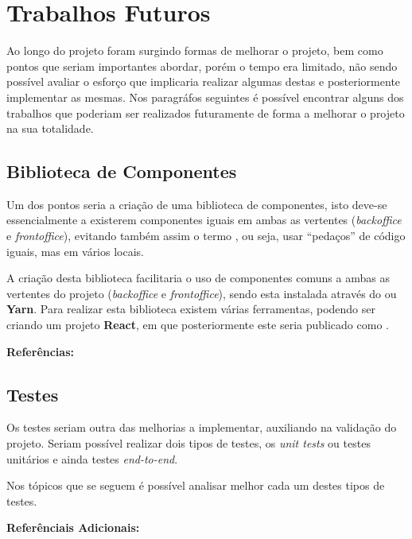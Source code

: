 \section{Trabalhos Futuros}

Ao longo do projeto foram surgindo formas de melhorar o projeto, bem como pontos que seriam importantes abordar, porém o tempo era limitado, não sendo possível avaliar o esforço que implicaria realizar algumas destas e posteriormente implementar as mesmas. Nos paragráfos seguintes é possível encontrar alguns dos trabalhos que poderiam ser realizados futuramente de forma a melhorar o projeto na sua totalidade.

\subsection{Biblioteca de Componentes}

Um dos pontos seria a criação de uma biblioteca de componentes, isto deve-se essencialmente a existerem componentes iguais em ambas as vertentes (\textit{backoffice} e \textit{frontoffice}), evitando também assim o termo \textbf{\textit{}}, ou seja, usar ``pedaços'' de código iguais, mas em vários locais.

A criação desta biblioteca facilitaria o uso de componentes comuns a ambas as vertentes do projeto (\textit{backoffice} e \textit{frontoffice}), sendo esta instalada através do \textbf{} ou \textbf{Yarn}. Para realizar esta biblioteca existem várias ferramentas, podendo ser criando um projeto \textbf{React}, em que posteriormente este seria publicado como .

\textbf{Referências:} \cite{publishReactPackage,createLibReact}

\subsection{Testes}

Os testes seriam outra das melhorias a implementar, auxiliando na validação do projeto.  Seriam possível realizar dois tipos de testes, os \textit{unit tests} ou testes unitários e ainda testes \textit{end-to-end}.

Nos tópicos que se seguem é possível analisar melhor cada um destes tipos de testes.

\vspace{10pt}

\textbf{Referênciais Adicionais:} \cite{reactEndToEndGuide,jestReact,endToEndCypress,endToEndJestPuppeteer,endToEndWJest,unitTestsReact,reactTesting,modernCypressTesting}

